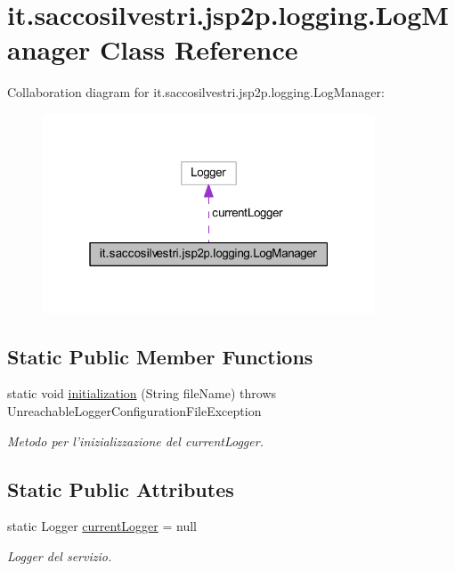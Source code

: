 \hypertarget{classit_1_1saccosilvestri_1_1jsp2p_1_1logging_1_1_log_manager}{
\section{it.saccosilvestri.jsp2p.logging.\-Log\-Manager \-Class \-Reference}
\label{classit_1_1saccosilvestri_1_1jsp2p_1_1logging_1_1_log_manager}
}


\-Collaboration diagram for it.saccosilvestri.jsp2p.logging.\-Log\-Manager\-:
\nopagebreak
\begin{figure}[H]
\begin{center}
\leavevmode
\includegraphics[width=280pt]{classit_1_1saccosilvestri_1_1jsp2p_1_1logging_1_1_log_manager__coll__graph}
\end{center}
\end{figure}
\subsection*{\-Static \-Public \-Member \-Functions}
\begin{DoxyCompactItemize}
\item 
static void \hyperlink{classit_1_1saccosilvestri_1_1jsp2p_1_1logging_1_1_log_manager_ad7278339415e5078870cff4342c4f2d0}{initialization} (\-String file\-Name)  throws Unreachable\-Logger\-Configuration\-File\-Exception 
\begin{DoxyCompactList}\small\item\em \-Metodo per l'inizializzazione del current\-Logger. \end{DoxyCompactList}\end{DoxyCompactItemize}
\subsection*{\-Static \-Public \-Attributes}
\begin{DoxyCompactItemize}
\item 
static \-Logger \hyperlink{classit_1_1saccosilvestri_1_1jsp2p_1_1logging_1_1_log_manager_ac534c0785d97731f02293b165c9e0bd7}{current\-Logger} = null
\begin{DoxyCompactList}\small\item\em \-Logger del servizio. \end{DoxyCompactList}\end{DoxyCompactItemize}


